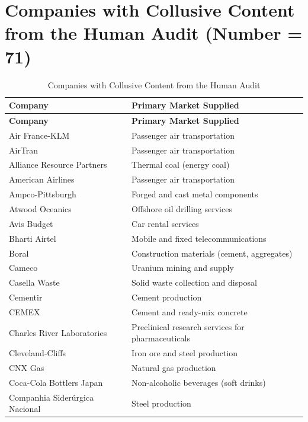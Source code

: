 \section{Companies with Collusive Content from the Human Audit (Number = 71)}\label{sec:si_companies_human_audit}
\begin{longtable}{|l|l|}
\caption{Companies with Collusive Content from the Human Audit}
\label{tab:si_companies_human_audit} \\
\hline
\textbf{Company} & \textbf{Primary Market Supplied} \\
\hline
\endfirsthead
\hline
\textbf{Company} & \textbf{Primary Market Supplied} \\
\hline
\endhead
    Air France-KLM & Passenger air transportation \\
    \hline
    AirTran & Passenger air transportation \\
    \hline
    Alliance Resource Partners & Thermal coal (energy coal) \\
    \hline
    American Airlines & Passenger air transportation \\
    \hline
    Ampco-Pittsburgh & Forged and cast metal components \\
    \hline
    Atwood Oceanics & Offshore oil drilling services \\
    \hline
    Avis Budget & Car rental services \\
    \hline
    Bharti Airtel & Mobile and fixed telecommunications \\
    \hline
    Boral & Construction materials (cement, aggregates) \\
    \hline
    Cameco & Uranium mining and supply \\
    \hline
    Casella Waste & Solid waste collection and disposal \\
    \hline
    Cementir & Cement production \\
    \hline
    CEMEX & Cement and ready-mix concrete \\
    \hline
    Charles River Laboratories & Preclinical research services for pharmaceuticals \\
    \hline
    Cleveland-Cliffs & Iron ore and steel production \\
    \hline
    CNX Gas & Natural gas production \\
    \hline
    Coca-Cola Bottlers Japan & Non-alcoholic beverages (soft drinks) \\
    \hline
    Companhia Siderúrgica Nacional & Steel production \\

\end{longtable}
